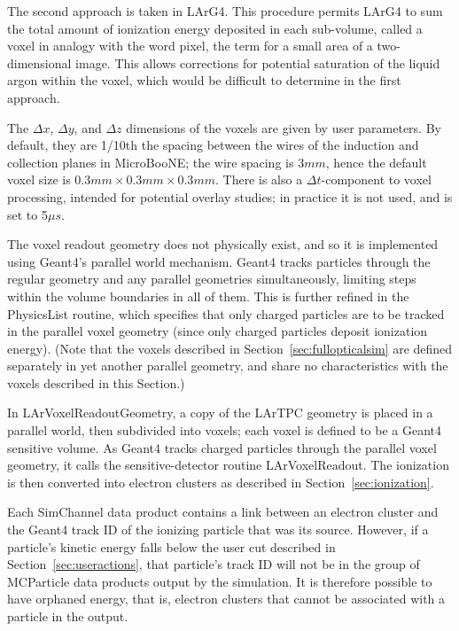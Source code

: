 \documentclass[12pt]{elsarticle}
\begin{document}
The second approach is taken in LArG4. This procedure permits LArG4 to
sum the total amount of ionization energy deposited in each
sub-volume, called a voxel in analogy with the word pixel, the
term for a small area of a two-dimensional image. This allows
corrections for potential saturation of the liquid argon within the
voxel, which would be difficult to determine in the first approach.

The ${\Delta}x$, ${\Delta}y$, and ${\Delta}z$ dimensions of the voxels
are given by user parameters. By default, they are 1/10th the spacing
between the wires of the induction and collection planes in
MicroBooNE; the wire spacing is 3$mm$, hence the default voxel size is
$0.3mm\times0.3mm\times0.3mm$. There is also a ${\Delta}t$-component
to voxel processing, intended for potential overlay studies; in
practice it is not used, and is set to 5${\mu}s$.

The voxel readout geometry does not physically exist, and so it is
implemented using Geant4's parallel world mechanism. Geant4 tracks
particles through the regular geometry and any parallel geometries
simultaneously, limiting steps within the volume boundaries in all of
them. This is further refined in the PhysicsList routine,
which specifies that only charged particles are to be tracked in the
parallel voxel geometry (since only charged particles deposit
ionization energy). (Note that the voxels described in 
Section~\ref{sec:fullopticalsim} are defined separately in yet another
parallel geometry, and share no characteristics with the voxels
described in this Section.)

In LArVoxelReadoutGeometry, a copy of the LArTPC geometry
is placed in a parallel world, then subdivided into voxels; each voxel
is defined to be a Geant4 sensitive volume. As Geant4 tracks charged
particles through the parallel voxel geometry, it calls the
sensitive-detector routine LArVoxelReadout. The ionization
is then converted into electron clusters as described in
Section~\ref{sec:ionization}.

Each SimChannel
data product contains a link between an electron cluster and the
Geant4 track ID of the ionizing particle that was its source. However,
if a particle's kinetic energy falls below the user cut described in
Section~\ref{sec:useractions}, that particle's track ID will not be in
the group of MCParticle data products output by the
simulation. It is therefore possible to have orphaned energy, that
is, electron clusters that cannot be associated with a particle in the
output. 
\end{document}
